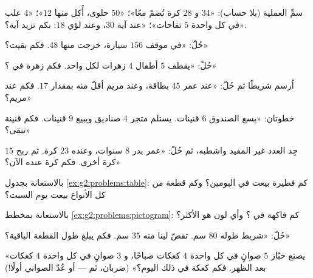\begin{exercise}[$\star$]\label{exo:g2:problems:1}
سمِّ العملية (بلا حساب): «$34$ و $28$ كرة تُضمّ
معًا»؛ «$50$ حلوى، أُكل منها $12$»؛ «$4$ علب في كل واحدة $5$
تفاحات»؛ «عند آية $30$، وعند لؤي $18$: بكم تزيد آية؟».
\end{exercise}

\begin{exercise}[$\star$]\label{exo:g2:problems:2}
حُلّ: «في موقف $156$ سيارة، خرجت منها $48$. فكم بقيت؟»
\end{exercise}

\begin{exercise}[$\star$]\label{exo:g2:problems:3}
حُلّ: «يقطف $5$ أطفال $4$ زهرات لكل واحد. فكم زهرة في
؟»
\end{exercise}

\begin{exercise}[$\star$]\label{exo:g2:problems:4}
اُرسم شريطًا ثم حُلّ: «عند عمر $45$ بطاقة، وعند مريم أقلّ منه
بمقدار $17$. فكم عند مريم؟»
\end{exercise}

\begin{exercise}[$\star$]\label{exo:g2:problems:5}
خطوتان: «يسع الصندوق $6$ قنينات. يستلم متجر $4$ صناديق
ويبيع $9$ قنينات. فكم قنينة تبقى؟»
\end{exercise}

\begin{exercise}[$\star$]\label{exo:g2:problems:6}
جِد العدد غير المفيد واشطبه، ثم حُلّ: «عمر بدر $8$
سنوات، وعنده $23$ كرة. ثم ربح $15$ كرة أخرى. فكم كرة عنده
الآن؟»
\end{exercise}

\begin{exercise}[$\star$]\label{exo:g2:problems:7}
بالاستعانة بجدول \cref{ex:g2:problems:table}: كم فطيرة بيعت في
اليومين؟ وكم قطعة من كل الأنواع بيعت يوم السبت؟
\end{exercise}

\begin{exercise}[$\star$]\label{exo:g2:problems:8}
بالاستعانة بمخطط \cref{ex:g2:problems:pictogram}: كم فاكهة في
؟ وأي لون هو الأكثر؟
\end{exercise}

\begin{exercise}[$\star$]\label{exo:g2:problems:9}
حُلّ: «شريط طوله $80$ سم. تقصّ لينا منه $35$ سم. فكم يبلغ طول
القطعة الباقية؟»
\end{exercise}

\begin{exercise}[$\star\star$]\label{exo:g2:problems:10}
«يصنع خبّاز $5$ صوانٍ في كل واحدة $4$ كعكات صباحًا، و $3$
صوانٍ في كل واحدة $4$ كعكات بعد الظهر. فكم كعكة في ذلك اليوم؟»
(ضربان، ثم  --- أو عُدّ الصواني أولًا!)
\end{exercise}
